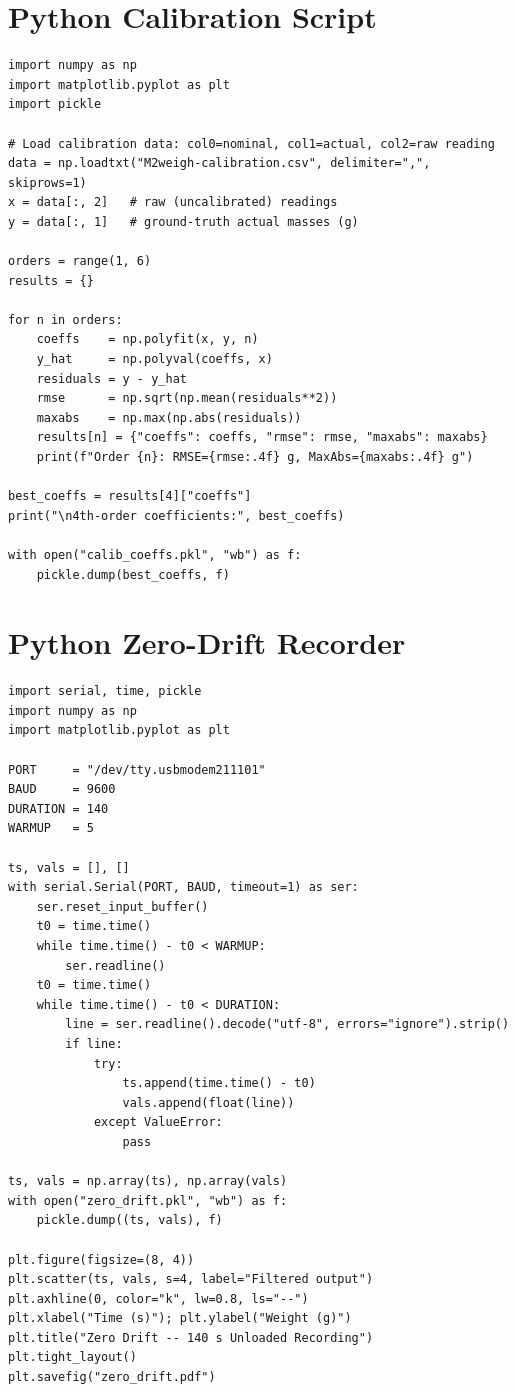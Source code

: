 \documentclass[12pt,a4paper]{article}
\begin{document}
\section{Python Calibration Script}
\label{app:python_calib}

\begin{lstlisting}[style=pythonstyle, caption={Polynomial calibration fitting and comparison.}]
import numpy as np
import matplotlib.pyplot as plt
import pickle

# Load calibration data: col0=nominal, col1=actual, col2=raw reading
data = np.loadtxt("M2weigh-calibration.csv", delimiter=",", skiprows=1)
x = data[:, 2]   # raw (uncalibrated) readings
y = data[:, 1]   # ground-truth actual masses (g)

orders = range(1, 6)
results = {}

for n in orders:
    coeffs    = np.polyfit(x, y, n)
    y_hat     = np.polyval(coeffs, x)
    residuals = y - y_hat
    rmse      = np.sqrt(np.mean(residuals**2))
    maxabs    = np.max(np.abs(residuals))
    results[n] = {"coeffs": coeffs, "rmse": rmse, "maxabs": maxabs}
    print(f"Order {n}: RMSE={rmse:.4f} g, MaxAbs={maxabs:.4f} g")

best_coeffs = results[4]["coeffs"]
print("\n4th-order coefficients:", best_coeffs)

with open("calib_coeffs.pkl", "wb") as f:
    pickle.dump(best_coeffs, f)
\end{lstlisting}

\section{Python Zero-Drift Recorder}
\label{app:python_drift}

\begin{lstlisting}[style=pythonstyle, caption={Zero-drift data collection and plotting.}]
import serial, time, pickle
import numpy as np
import matplotlib.pyplot as plt

PORT     = "/dev/tty.usbmodem211101"
BAUD     = 9600
DURATION = 140
WARMUP   = 5

ts, vals = [], []
with serial.Serial(PORT, BAUD, timeout=1) as ser:
    ser.reset_input_buffer()
    t0 = time.time()
    while time.time() - t0 < WARMUP:
        ser.readline()
    t0 = time.time()
    while time.time() - t0 < DURATION:
        line = ser.readline().decode("utf-8", errors="ignore").strip()
        if line:
            try:
                ts.append(time.time() - t0)
                vals.append(float(line))
            except ValueError:
                pass

ts, vals = np.array(ts), np.array(vals)
with open("zero_drift.pkl", "wb") as f:
    pickle.dump((ts, vals), f)

plt.figure(figsize=(8, 4))
plt.scatter(ts, vals, s=4, label="Filtered output")
plt.axhline(0, color="k", lw=0.8, ls="--")
plt.xlabel("Time (s)"); plt.ylabel("Weight (g)")
plt.title("Zero Drift -- 140 s Unloaded Recording")
plt.tight_layout()
plt.savefig("zero_drift.pdf")
\end{lstlisting}
\end{document}
